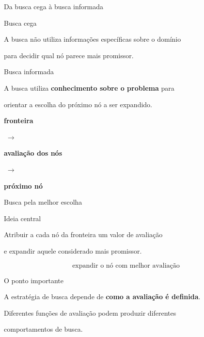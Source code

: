 \documentclass[xcolor=dvipsnames,table]{beamer}
\begin{document}
\begin{frame}{Da busca cega à busca informada}

    \begin{block}{Busca cega}

        A busca não utiliza informações específicas sobre o domínio

        para decidir qual nó parece mais promissor.

    \end{block}

    \begin{block}{Busca informada}

        A busca utiliza \textbf{conhecimento sobre o problema} para

        orientar a escolha do próximo nó a ser expandido.

    \end{block}

    \begin{center}

        \Large

        \textbf{fronteira}

        $\;\longrightarrow\;$

        \textbf{avaliação dos nós}

        $\;\longrightarrow\;$

        \textbf{próximo nó}

    \end{center}

\end{frame}

\begin{frame}{Busca pela melhor escolha}

    \begin{block}{Ideia central}

        Atribuir a cada nó da fronteira um valor de avaliação

        e expandir aquele considerado mais promissor.

    \end{block}

    \begin{center}

        \Large

        \[
        \boxed{\text{expandir o nó com melhor avaliação}}
        \]

    \end{center}

    \begin{block}{O ponto importante}

        A estratégia de busca depende de \textbf{como a avaliação é definida}.

        Diferentes funções de avaliação podem produzir diferentes

        comportamentos de busca.

    \end{block}

\end{frame}
\end{document}
